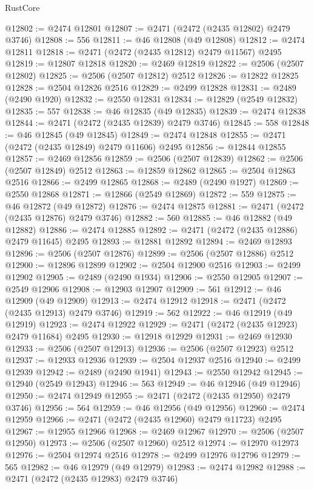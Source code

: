 \begin{lexlean}{RustCore}
\begin{coremodule}
@12802 := @2474 @12801
@12807 := @2471 (@2472 (@2435 @12802) @2479 @3746)
@12808 := 556
@12811 := @46 @12808 (@49 @12808)
@12812 := @2474 @12811
@12818 := @2471 (@2472 (@2435 @12812) @2479 @11567) @2495
@12819 := @12807 @12818
@12820 := @2469 @12819
@12822 := @2506 (@2507 @12802)
@12825 := @2506 (@2507 @12812) @2512
@12826 := @12822 @12825
@12828 := @2504 @12826 @2516
@12829 := @2499 @12828
@12831 := @2489 (@2490 @1920)
@12832 := @2550 @12831
@12834 := @12829 (@2549 @12832)
@12835 := 557
@12838 := @46 @12835 (@49 @12835)
@12839 := @2474 @12838
@12844 := @2471 (@2472 (@2435 @12839) @2479 @3746)
@12845 := 558
@12848 := @46 @12845 (@49 @12845)
@12849 := @2474 @12848
@12855 := @2471 (@2472 (@2435 @12849) @2479 @11606) @2495
@12856 := @12844 @12855
@12857 := @2469 @12856
@12859 := @2506 (@2507 @12839)
@12862 := @2506 (@2507 @12849) @2512
@12863 := @12859 @12862
@12865 := @2504 @12863 @2516
@12866 := @2499 @12865
@12868 := @2489 (@2490 @1927)
@12869 := @2550 @12868
@12871 := @12866 (@2549 @12869)
@12872 := 559
@12875 := @46 @12872 (@49 @12872)
@12876 := @2474 @12875
@12881 := @2471 (@2472 (@2435 @12876) @2479 @3746)
@12882 := 560
@12885 := @46 @12882 (@49 @12882)
@12886 := @2474 @12885
@12892 := @2471 (@2472 (@2435 @12886) @2479 @11645) @2495
@12893 := @12881 @12892
@12894 := @2469 @12893
@12896 := @2506 (@2507 @12876)
@12899 := @2506 (@2507 @12886) @2512
@12900 := @12896 @12899
@12902 := @2504 @12900 @2516
@12903 := @2499 @12902
@12905 := @2489 (@2490 @1934)
@12906 := @2550 @12905
@12907 := @2549 @12906
@12908 := @12903 @12907
@12909 := 561
@12912 := @46 @12909 (@49 @12909)
@12913 := @2474 @12912
@12918 := @2471 (@2472 (@2435 @12913) @2479 @3746)
@12919 := 562
@12922 := @46 @12919 (@49 @12919)
@12923 := @2474 @12922
@12929 := @2471 (@2472 (@2435 @12923) @2479 @11684) @2495
@12930 := @12918 @12929
@12931 := @2469 @12930
@12933 := @2506 (@2507 @12913)
@12936 := @2506 (@2507 @12923) @2512
@12937 := @12933 @12936
@12939 := @2504 @12937 @2516
@12940 := @2499 @12939
@12942 := @2489 (@2490 @1941)
@12943 := @2550 @12942
@12945 := @12940 (@2549 @12943)
@12946 := 563
@12949 := @46 @12946 (@49 @12946)
@12950 := @2474 @12949
@12955 := @2471 (@2472 (@2435 @12950) @2479 @3746)
@12956 := 564
@12959 := @46 @12956 (@49 @12956)
@12960 := @2474 @12959
@12966 := @2471 (@2472 (@2435 @12960) @2479 @11723) @2495
@12967 := @12955 @12966
@12968 := @2469 @12967
@12970 := @2506 (@2507 @12950)
@12973 := @2506 (@2507 @12960) @2512
@12974 := @12970 @12973
@12976 := @2504 @12974 @2516
@12978 := @2499 @12976 @12796
@12979 := 565
@12982 := @46 @12979 (@49 @12979)
@12983 := @2474 @12982
@12988 := @2471 (@2472 (@2435 @12983) @2479 @3746)

\end{coremodule}
\end{lexlean}
